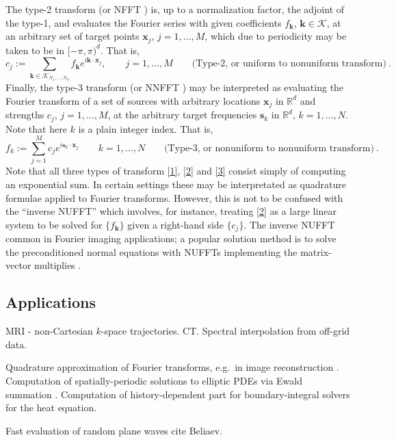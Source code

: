\documentclass[10pt]{article}
\newcommand{\be}{\begin{equation}}
\newcommand{\ee}{\end{equation}}
\newcommand{\mbf}[1]{{\mathbf #1}}
\newcommand{\RR}{\mathbb{R}}
\newcommand{\xx}{\mbf{x}}
\newcommand{\sss}{\mbf{s}}
\newcommand{\kk}{\mbf{k}}
\newcommand{\KK}{{\mathcal K}}
\newcommand{\NU}{{nonuniform}}
\newcommand{\U}{{uniform}}
\begin{document}
The type-2 transform (or NFFT \cite{usingnfft})
is, up to a normalization factor, the adjoint of the
type-1, and evaluates the Fourier series with given coefficients
$f_\kk$, $\kk\in\KK$, at an arbitrary set of target points
$\xx_j$, $j=1,\ldots,M$, which due to periodicity may be taken to be in $[-\pi,\pi)^d$.
  That is,
  \be
  c_j := \sum_{\kk\in\KK_{N_1,\dots,N_d}} f_\kk e^{i \kk\cdot \xx_j},
  \qquad j=1,\dots, M
\qquad \mbox{(Type-2, or \U\ to \NU\ transform)}
~.
\label{2}
\ee
Finally, the type-3 transform
\cite{nufft3} (or NNFFT \cite{usingnfft})
may be interpreted as evaluating the
Fourier transform of a set of sources with arbitrary locations $\xx_j$
in $\RR^d$
and strengths $c_j$, $j=1,\dots, M$, at the arbitrary target frequencies
$\sss_k$ in $\RR^d$, $k=1,\dots, N$. Note that here $k$ is a plain integer
index.
That is,
\be
f_k := \sum_{j=1}^M c_j e^{i \sss_k \cdot \xx_j}
  \qquad k=1,\dots, N
\qquad \mbox{(Type-3, or \NU\ to \NU\ transform)}
~.
\label{3}
\ee
Note that all three types of transform \eqref{1}, \eqref{2} and \eqref{3}
consist simply of computing an exponential sum.
In certain settings these may be interpretated as quadrature formulae
applied to Fourier transforms.
However, this is not to be confused with the ``inverse NUFFT'' which involves,
for instance, treating \eqref{2} as a large linear system to be solved for
$\{f_\kk\}$ given a right-hand side
$\{c_j\}$. The inverse NUFFT common in Fourier imaging
applications; a popular solution method is to solve
the preconditioned normal equations with
NUFFTs implementing the matrix-vector multiplies
\cite{fessler,fourmont,fastsinc,gelbrecon}.







\subsection{Applications}

MRI - non-Cartesian $k$-space trajectories.
CT.
Spectral interpolation from off-grid data.

Quadrature approximation of Fourier transforms, e.g.\
in image reconstruction \cite{cryo}.
Computation of spatially-periodic solutions to elliptic
PDEs via Ewald summation
\cite{lindbo11}.
Computation of history-dependent part for boundary-integral solvers
for the heat equation.%

Fast evaluation of random plane waves cite Beliaev.
\end{document}

